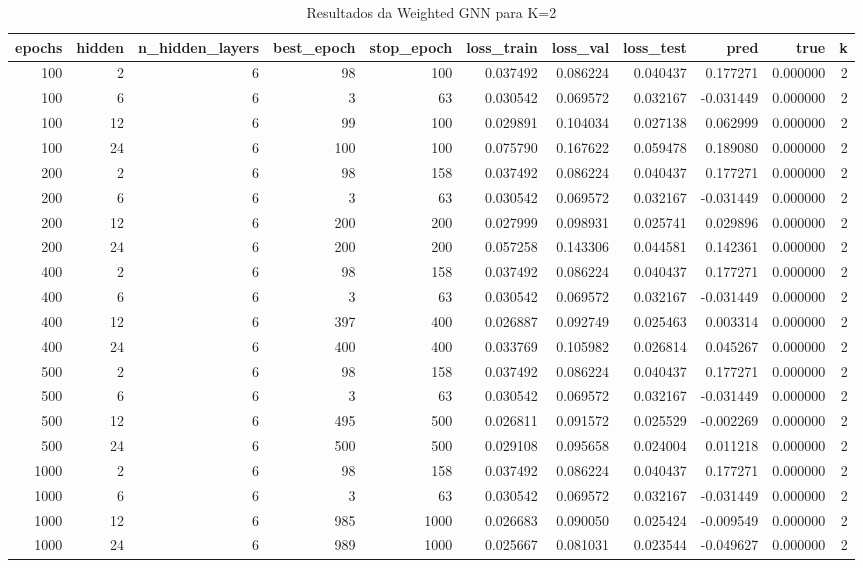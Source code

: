 \begin{table}
\caption{Resultados da Weighted GNN para K=2}
\label{tab:weighted_gnn_results_k2}
\begin{tabular}{rrrrrrrrrrr}
\toprule
epochs & hidden & n\_hidden\_layers & best\_epoch & stop\_epoch & loss\_train & loss\_val & loss\_test & pred & true & k \\
\midrule
100 & 2 & 6 & 98 & 100 & 0.037492 & 0.086224 & 0.040437 & 0.177271 & 0.000000 & 2 \\
100 & 6 & 6 & 3 & 63 & 0.030542 & 0.069572 & 0.032167 & -0.031449 & 0.000000 & 2 \\
100 & 12 & 6 & 99 & 100 & 0.029891 & 0.104034 & 0.027138 & 0.062999 & 0.000000 & 2 \\
100 & 24 & 6 & 100 & 100 & 0.075790 & 0.167622 & 0.059478 & 0.189080 & 0.000000 & 2 \\
200 & 2 & 6 & 98 & 158 & 0.037492 & 0.086224 & 0.040437 & 0.177271 & 0.000000 & 2 \\
200 & 6 & 6 & 3 & 63 & 0.030542 & 0.069572 & 0.032167 & -0.031449 & 0.000000 & 2 \\
200 & 12 & 6 & 200 & 200 & 0.027999 & 0.098931 & 0.025741 & 0.029896 & 0.000000 & 2 \\
200 & 24 & 6 & 200 & 200 & 0.057258 & 0.143306 & 0.044581 & 0.142361 & 0.000000 & 2 \\
400 & 2 & 6 & 98 & 158 & 0.037492 & 0.086224 & 0.040437 & 0.177271 & 0.000000 & 2 \\
400 & 6 & 6 & 3 & 63 & 0.030542 & 0.069572 & 0.032167 & -0.031449 & 0.000000 & 2 \\
400 & 12 & 6 & 397 & 400 & 0.026887 & 0.092749 & 0.025463 & 0.003314 & 0.000000 & 2 \\
400 & 24 & 6 & 400 & 400 & 0.033769 & 0.105982 & 0.026814 & 0.045267 & 0.000000 & 2 \\
500 & 2 & 6 & 98 & 158 & 0.037492 & 0.086224 & 0.040437 & 0.177271 & 0.000000 & 2 \\
500 & 6 & 6 & 3 & 63 & 0.030542 & 0.069572 & 0.032167 & -0.031449 & 0.000000 & 2 \\
500 & 12 & 6 & 495 & 500 & 0.026811 & 0.091572 & 0.025529 & -0.002269 & 0.000000 & 2 \\
500 & 24 & 6 & 500 & 500 & 0.029108 & 0.095658 & 0.024004 & 0.011218 & 0.000000 & 2 \\
1000 & 2 & 6 & 98 & 158 & 0.037492 & 0.086224 & 0.040437 & 0.177271 & 0.000000 & 2 \\
1000 & 6 & 6 & 3 & 63 & 0.030542 & 0.069572 & 0.032167 & -0.031449 & 0.000000 & 2 \\
1000 & 12 & 6 & 985 & 1000 & 0.026683 & 0.090050 & 0.025424 & -0.009549 & 0.000000 & 2 \\
1000 & 24 & 6 & 989 & 1000 & 0.025667 & 0.081031 & 0.023544 & -0.049627 & 0.000000 & 2 \\
\bottomrule
\end{tabular}
\end{table}
